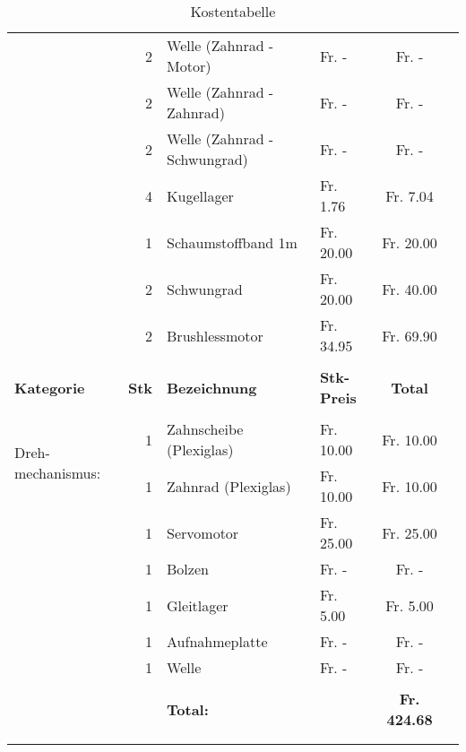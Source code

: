 \begin{longtable}{p{1.7cm}rllcc}
               & 2     & Welle (Zahnrad - Motor)      &  Fr. -     &  Fr. -     \\
               & 2     & Welle (Zahnrad - Zahnrad)    &  Fr. -     &  Fr. -     \\
               & 2     & Welle (Zahnrad - Schwungrad) &  Fr. -     &  Fr. -     \\
               & 4     & Kugellager                   &  Fr. 1.76  &  Fr. 7.04  \\
               & 1     & Schaumstoffband 1m           &  Fr. 20.00 &  Fr. 20.00 \\
               & 2     & Schwungrad                   &  Fr. 20.00 &  Fr. 40.00 \\
               & 2     & Brushlessmotor               &  Fr. 34.95 &  Fr. 69.90 \\
               &       &                              &            &            \\
    \newpage
    \textbf{Kategorie} & \textbf{Stk} & \textbf{Bezeichnung} & \textbf{Stk-Preis}
    & \textbf{Total} \\
    \hline     &       &                              &            &            \\
    \multirow{2}{1.7cm}{Dreh-mechanismus:} 
               & 1     & Zahnscheibe (Plexiglas)      &  Fr. 10.00 &  Fr. 10.00 \\
               & 1     & Zahnrad (Plexiglas)          &  Fr. 10.00 &  Fr. 10.00 \\
               & 1     & Servomotor                   &  Fr. 25.00 &  Fr. 25.00 \\
               & 1     & Bolzen                       &  Fr. -     &  Fr. -     \\
               & 1     & Gleitlager                   &  Fr. 5.00  &  Fr. 5.00  \\
               & 1     & Aufnahmeplatte               &  Fr. -     &  Fr. -     \\
               & 1     & Welle                        &  Fr. -     &  Fr. -     \\
               &       &                              &            &            \\
               &       & \textbf{Total:} & \textbf{} & \textbf{ Fr. 424.68 }    \\
               &       &                              &            &            \\
               
       \caption{Kostentabelle}
       \label{tab:Kostentabelle}
    \end{longtable}